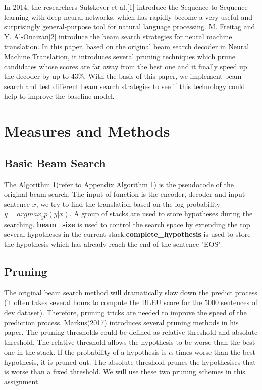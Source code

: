 \documentclass[a4paper]{article}
\begin{document}
In 2014, the researchers Sutskever et al.[1] introduce the Sequence-to-Sequence learning with deep neural networks, which has rapidly become a very useful and surprisingly general-purpose tool for natural language processing. M. Freitag and Y. Al-Onaizan[2] introduce the beam search strategies for neural machine translation. In this paper, based on the original beam search decoder in Neural Machine Translation, it introduces several pruning techniques which prune candidates whose scores are far away from the best one and it finally speed up the decoder by up to 43\%. With the basis of this paper, we implement beam search and test different beam search strategies to see if this technology could help to improve the baseline model.



\section{Measures and Methods}

\subsection{Basic Beam Search}
The Algorithm 1(refer to Appendix Algorithm 1) is the pseudocode of the original beam search. The input of function is the encoder, decoder and input sentence $x$, we try to find the translation based on the log probability $y =argmax_y p(y|x)$. A group of stacks are used to store hypotheses during the searching. \textbf{beam\_size} is used to control the search space by extending the top several hypotheses in the current stack.\textbf{complete\_hypothesis} is used to store the hypothesis which has already reach the end of the sentence "EOS".


\subsection{Pruning}
The original beam search method will dramatically slow down the predict process (it often takes several hours to compute the BLEU score for the 5000 sentences of dev dataset). Therefore, pruning tricks are needed to improve the speed of the prediction process. Markus(2017) introduces several pruning methods in his paper. The pruning thresholds could be defined as relative threshold and absolute threshold. The relative threshold allows the hypothesis to be worse than the best one in the stack. If the probability of a hypothesis is $\alpha$ times worse than the best hypothesis, it is pruned out. The absolute threshold prunes the hypothesises that is worse than a fixed threshold. We will use these two pruning schemes in this assignment.
\end{document}
